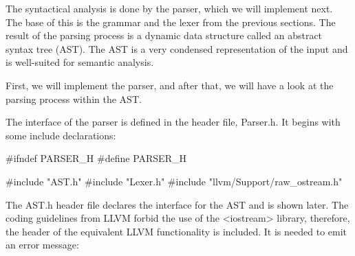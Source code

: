 The syntactical analysis is done by the parser, which we will implement next. The base of this is the grammar and the lexer from the previous sections. The result of the parsing process is a dynamic data structure called an abstract syntax tree (AST). The AST is a very condensed representation of the input and is well-suited for semantic analysis.

First, we will implement the parser, and after that, we will have a look at the parsing process within the AST.



The interface of the parser is defined in the header file, Parser.h. It begins with some include declarations:

\begin{cpp}
#ifndef PARSER_H
#define PARSER_H

#include "AST.h"
#include "Lexer.h"
#include "llvm/Support/raw_ostream.h"
\end{cpp}

The AST.h header file declares the interface for the AST and is shown later. The coding guidelines from LLVM forbid the use of the <iostream> library, therefore, the header of the equivalent LLVM functionality is included. It is needed to emit an error message:

